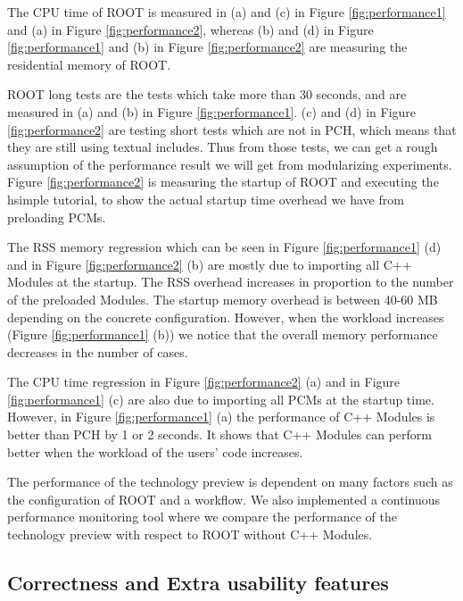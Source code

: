 \documentclass{webofc}
\begin{document}
The CPU time of ROOT is measured in (a) and (c) in Figure \ref{fig:performance1} and (a) in Figure \ref{fig:performance2}, whereas (b) and (d) in Figure \ref{fig:performance1} and (b) in Figure \ref{fig:performance2} are measuring the residential memory of ROOT.

ROOT long tests are the tests which take more than 30 seconds, and are measured in (a) and (b) in Figure \ref{fig:performance1}. (c) and (d) in Figure \ref{fig:performance2} are testing short tests which are not in PCH, which means that they are still using textual includes. Thus from those tests, we can get a rough assumption of the performance result we will get from modularizing experiments. Figure \ref{fig:performance2} is measuring the startup of ROOT and executing the hsimple tutorial, to show the actual startup time overhead we have from preloading PCMs.

The RSS memory regression which can be seen in Figure \ref{fig:performance1} (d) and in Figure \ref{fig:performance2} (b) are mostly due to importing all C++ Modules at the startup. The RSS overhead increases in proportion to the number of the preloaded Modules. The startup memory overhead is between 40-60 MB depending on the concrete configuration. However, when the workload increases (Figure \ref{fig:performance1} (b)) we notice that the overall memory performance decreases in the number of cases.

The CPU time regression in Figure \ref{fig:performance2} (a) and in Figure \ref{fig:performance1} (c) are also due to importing all PCMs at the startup time. However, in Figure \ref{fig:performance1} (a) the performance of C++ Modules is better than PCH by 1 or 2 seconds. It shows that C++ Modules can perform better when the workload of the users' code increases.

The performance of the technology preview is dependent on many factors such as the configuration of ROOT and a workflow. We also implemented a continuous performance monitoring tool \cite{rootbench} where we compare the performance of the technology preview with respect to ROOT without C++ Modules.

\subsection{Correctness and Extra usability features}
\label{correctness}
\end{document}
